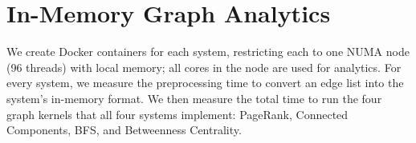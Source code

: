 \section{In-Memory Graph Analytics}
\label{sec:eval:inmem}

%
%
We create Docker containers for each system, restricting each to one NUMA node (96 threads) with local memory; all cores in the node are used for analytics.
For every system, we measure the preprocessing time to convert an edge list into the system's in-memory format.
We then measure the total time to run the four graph kernels that all four systems implement: PageRank, Connected Components, BFS, and Betweenness Centrality.

